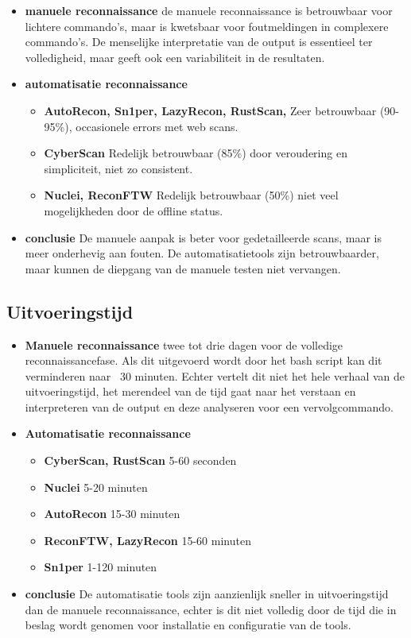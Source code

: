 \begin{itemize}
  \item \textbf{manuele reconnaissance} de manuele reconnaissance is betrouwbaar voor lichtere commando's, maar is kwetsbaar voor foutmeldingen in complexere commando's. De menselijke interpretatie van de output is essentieel ter volledigheid, maar geeft ook een variabiliteit in de resultaten.
  \item \textbf{automatisatie reconnaissance} 
  \begin{itemize}
    \item \textbf{AutoRecon, Sn1per, LazyRecon, RustScan, } Zeer betrouwbaar (90-95\%), occasionele errors met web scans.
    \item \textbf{CyberScan} Redelijk betrouwbaar (85\%) door veroudering en simpliciteit, niet zo consistent.
    \item \textbf{Nuclei, ReconFTW} Redelijk betrouwbaar (50\%) niet veel mogelijkheden door de offline status.
  \end{itemize}
  \item \textbf{conclusie} De manuele aanpak is beter voor gedetailleerde scans, maar is meer onderhevig aan fouten. De automatisatietools zijn betrouwbaarder, maar kunnen de diepgang van de manuele testen niet vervangen.
\end{itemize}

\subsection{Uitvoeringstijd}

\begin{itemize}
  \item \textbf{Manuele reconnaissance} twee tot drie dagen voor de volledige reconnaissancefase. Als dit uitgevoerd wordt door het bash script kan dit verminderen naar ~30 minuten. Echter vertelt dit niet het hele verhaal van de uitvoeringstijd, het merendeel van de tijd gaat naar het verstaan en interpreteren van de output en deze analyseren voor een vervolgcommando.
  \newpage
  \item \textbf{Automatisatie reconnaissance} 
  \begin{itemize}
    \item \textbf{CyberScan, RustScan} 5-60 seconden
    \item \textbf{Nuclei} 5-20 minuten
    \item \textbf{AutoRecon} 15-30 minuten
    \item \textbf{ReconFTW, LazyRecon} 15-60 minuten
    \item \textbf{Sn1per} 1-120 minuten
  \end{itemize}
  \item \textbf{conclusie} De automatisatie tools zijn aanzienlijk sneller in uitvoeringstijd dan de manuele reconnaissance, echter is dit niet volledig door de tijd die in beslag wordt genomen voor installatie en configuratie van de tools.
\end{itemize}


